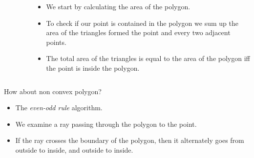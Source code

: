 \documentclass{beamer}
\begin{document}
\begin{frame}[plain]
\begin{columns}
\begin{column}{0.6\textwidth}
\begin{figure}
      \end{figure}
    \end{column}
    \begin{column}{0.5\textwidth}
      \footnotesize
      \begin{itemize}
        \item We start by calculating the area of the polygon.
        \item To check if our point is contained in the polygon we sum up the
          area of the triangles formed the point and every two adjacent points.
        \item The total area of the triangles is equal to the area of the
          polygon iff the point is inside the polygon.
      \end{itemize}
    \end{column}
  \end{columns}
\end{frame}

\begin{frame}[plain]
  \vspace{40pt}
  How about non convex polygon?
  \begin{itemize}
    \item The \emph{even-odd rule} algorithm.
    \item We examine a ray passing through the polygon to the point.
    \item If the ray crosses the boundary of the polygon, then it alternately
      goes from outside to inside, and outside to inside.
  \end{itemize}
\end{frame}
\end{document}
